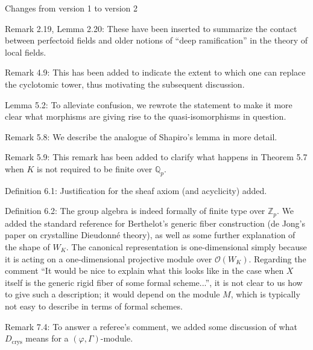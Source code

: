 \documentclass[12pt]{amsart}
\begin{document}
\begin{center}
Changes from version 1 to version 2
\end{center}

Remark 2.19, Lemma 2.20: These have been inserted to summarize the contact between perfectoid fields and older notions of ``deep ramification'' in the theory of local fields.

Remark 4.9: This has been added to indicate the extent to which one can replace the cyclotomic tower, thus motivating the subsequent discussion.

Lemma 5.2: To alleviate confusion, we rewrote the statement to make it more clear what morphisms are giving rise to the quasi-isomorphisms in question.

Remark 5.8: We describe the analogue of Shapiro's lemma in more detail.

Remark 5.9: This remark has been added to clarify what happens in Theorem 5.7 when $K$ is not required to be finite over $\mathbb{Q}_p$.

Definition 6.1: Justification for the sheaf axiom (and acyclicity) added.

Definition 6.2: The group algebra is indeed formally of finite type over $\mathbb{Z}_p$. We added the standard reference for Berthelot's generic fiber construction (de Jong's paper on crystalline Dieudonn\'e theory), as well as some further explanation of the shape of $W_K$. The canonical representation is one-dimensional simply because it is acting on a one-dimensional projective module over $\mathcal{O}(W_K)$. Regarding the comment ``It would be nice to explain what this looks like in the case when $X$ itself is the generic rigid fiber of some formal scheme...'', it is not clear to us how to give such a description; it would depend on the module $M$, which is typically not easy to describe in terms of formal schemes.

Remark 7.4: To answer a referee's comment, we added some discussion of what $D_{\mathrm{crys}}$ means for a $(\varphi, \Gamma)$-module.
\end{document}
